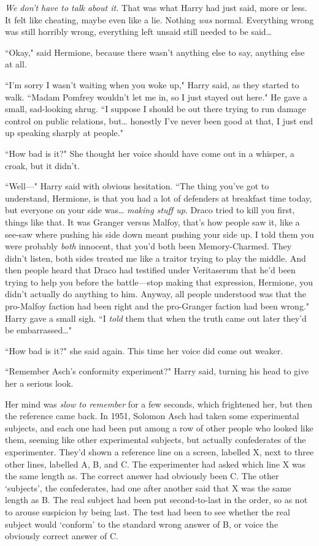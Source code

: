 \emph{We don't have to talk about it.} That was what Harry had just said, more or less. It felt like cheating, maybe even like a lie. Nothing \emph{was} normal. Everything wrong was still horribly wrong, everything left unsaid still needed to be said{\ldots}

``Okay," said Hermione, because there wasn't anything else to say, anything else at all.

``I'm sorry I wasn't waiting when you woke up," Harry said, as they started to walk. ``Madam Pomfrey wouldn't let me in, so I just stayed out here." He gave a small, sad-looking shrug. ``I suppose I should be out there trying to run damage control on public relations, but{\ldots} honestly I've never been good at that, I just end up speaking sharply at people."

``How bad is it?" She thought her voice should have come out in a whisper, a croak, but it didn't.

``Well—" Harry said with obvious hesitation. ``The thing you've got to understand, Hermione, is that you had a lot of defenders at breakfast time today, but everyone on your side was{\ldots} \emph{making stuff up}. Draco tried to kill you first, things like that. It was Granger versus Malfoy, that's how people saw it, like a see-saw where pushing his side down meant pushing your side up. I told them you were probably \emph{both} innocent, that you'd both been Memory-Charmed. They didn't listen, both sides treated me like a traitor trying to play the middle. And then people heard that Draco had testified under Veritaserum that he'd been trying to help you before the battle—stop making that expression, Hermione, you didn't actually do anything to him. Anyway, all people understood was that the pro-Malfoy faction had been right and the pro-Granger faction had been wrong." Harry gave a small sigh. ``I \emph{told} them that when the truth came out later they'd be embarrassed{\ldots}"

``How bad is it?" she said again. This time her voice did come out weaker.

``Remember Asch's conformity experiment?" Harry said, turning his head to give her a serious look.

Her mind was \emph{slow to remember} for a few seconds, which frightened her, but then the reference came back. In 1951, Solomon Asch had taken some experimental subjects, and each one had been put among a row of other people who looked like them, seeming like other experimental subjects, but actually confederates of the experimenter. They'd shown a reference line on a screen, labelled X, next to three other lines, labelled A, B, and C\@. The experimenter had asked which line X was the same length as. The correct answer had obviously been C\@. The other `subjects', the confederates, had one after another said that X was the same length as B\@. The real subject had been put second-to-last in the order, so as not to arouse suspicion by being last. The test had been to see whether the real subject would `conform' to the standard wrong answer of B, or voice the obviously correct answer of C\@.

